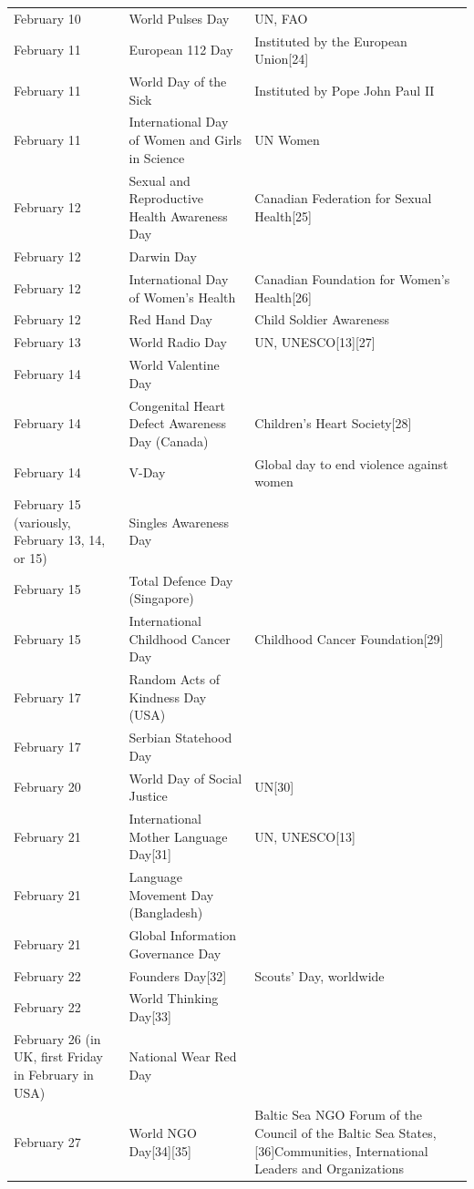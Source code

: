 \documentclass[
  openany]{book}
\begin{document}
\begin{longtable}[t]{>{\raggedright\arraybackslash}p{8em}>{\raggedright\arraybackslash}p{20em}>{\raggedright\arraybackslash}p{12em}}
\addlinespace
February 10 & World Pulses Day & UN, FAO\\
February 11 & European 112 Day & Instituted by the European Union[24]\\
February 11 & World Day of the Sick & Instituted by Pope John Paul II\\
February 11 & International Day of Women and Girls in Science & UN Women\\
February 12 & Sexual and Reproductive Health Awareness Day & Canadian Federation for Sexual Health[25]\\
\addlinespace
February 12 & Darwin Day & \\
February 12 & International Day of Women's Health & Canadian Foundation for Women's Health[26]\\
February 12 & Red Hand Day & Child Soldier Awareness\\
February 13 & World Radio Day & UN, UNESCO[13][27]\\
February 14 & World Valentine Day & \\
\addlinespace
February 14 & Congenital Heart Defect Awareness Day (Canada) & Children's Heart Society[28]\\
February 14 & V-Day & Global day to end violence against women\\
February 15 (variously, February 13, 14, or 15) & Singles Awareness Day & \\
February 15 & Total Defence Day (Singapore) & \\
February 15 & International Childhood Cancer Day & Childhood Cancer Foundation[29]\\
\addlinespace
February 17 & Random Acts of Kindness Day (USA) & \\
February 17 & Serbian Statehood Day & \\
February 20 & World Day of Social Justice & UN[30]\\
February 21 & International Mother Language Day[31] & UN, UNESCO[13]\\
February 21 & Language Movement Day (Bangladesh) & \\
\addlinespace
February 21 & Global Information Governance Day & \\
February 22 & Founders Day[32] & Scouts' Day, worldwide\\
February 22 & World Thinking Day[33] & \\
February 26 (in UK, first Friday in February in USA) & National Wear Red Day & \\
February 27 & World NGO Day[34][35] & Baltic Sea NGO Forum of the Council of the Baltic Sea States,[36]Communities, International Leaders and Organizations\\

\end{longtable}
\end{document}

